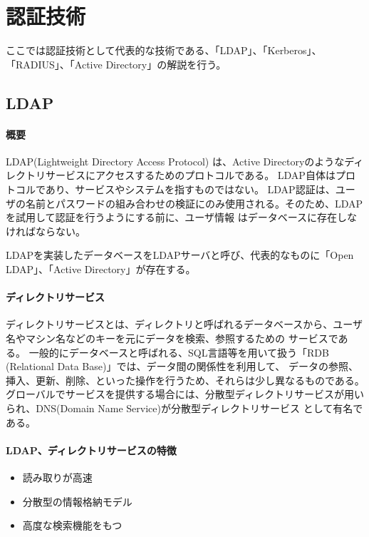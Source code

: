 \documentclass[11pt,a4j,titlepage]{jreport}
\begin{document}
\chapter{認証技術}\label{Authentication}
ここでは認証技術として代表的な技術である、「LDAP」、「Kerberos」、「RADIUS」、「Active Directory」の解説を行う。

\section{LDAP}
\subsubsection*{概要}
LDAP(Lightweight Directory Access Protocol) \cite{RFC4511}は、Active Directoryのようなディレクトリサービスにアクセスするためのプロトコルである。
LDAP自体はプロトコルであり、サービスやシステムを指すものではない。
LDAP認証は、ユーザの名前とパスワードの組み合わせの検証にのみ使用される。そのため、LDAPを試用して認証を行うようにする前に、ユーザ情報
はデータベースに存在しなければならない。

LDAPを実装したデータベースをLDAPサーバと呼び、代表的なものに「Open LDAP」、「Active Directory」が存在する。\par
\subsubsection*{ディレクトリサービス}
ディレクトリサービスとは、ディレクトリと呼ばれるデータベースから、ユーザ名やマシン名などのキーを元にデータを検索、参照するための
サービスである。
一般的にデータベースと呼ばれる、SQL言語等を用いて扱う「RDB (Relational Data Base)」では、データ間の関係性を利用して、
データの参照、挿入、更新、削除、といった操作を行うため、それらは少し異なるものである。
グローバルでサービスを提供する場合には、分散型ディレクトリサービスが用いられ、DNS(Domain Name Service)が分散型ディレクトリサービス
として有名である。

\subsubsection*{LDAP、ディレクトリサービスの特徴}

\begin{itemize}
    \item 読み取りが高速
    \item 分散型の情報格納モデル
    \item 高度な検索機能をもつ
\end{itemize}
\end{document}
